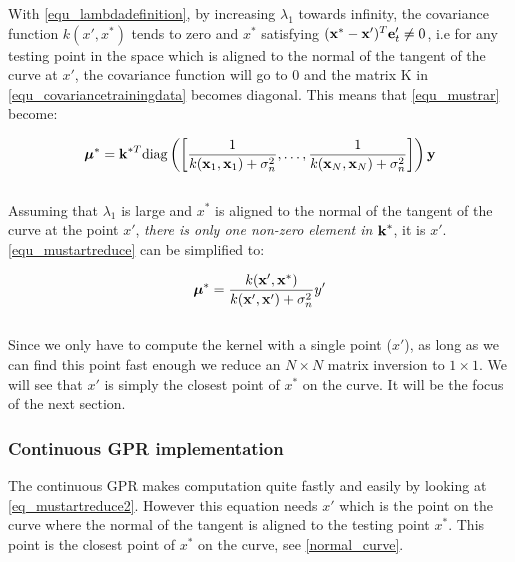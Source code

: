 With \autoref{equ_lambdadefinition}, by increasing $\lambda_1$ towards infinity, the covariance function $k(x', x^*)$ tends to zero and $x^*$ satisfying $(\boldsymbol{\mathbf{x}}^* - \boldsymbol{\mathbf{x}}')^T\boldsymbol{\mathbf{e}}'_t \neq 0$, i.e for any testing point in the space which is aligned to the normal of the tangent of the curve at $x'$, the covariance function will go to 0 and the matrix \mat K in \autoref{equ_covariancetrainingdata} becomes diagonal. This means that \autoref{equ_mustrar} become:

\begin{equation}
  \label{equ_mustartreduce}
    \boldsymbol{\mathbf{\mu}}^* = \boldsymbol{\mathbf{k}}^{*T} \text{diag}\left(\left[\frac{1}{k(\boldsymbol{\mathbf{x}}_1,\boldsymbol{\mathbf{x}}_1)+\sigma_n^2},\hdots,\frac{1}{k(\boldsymbol{\mathbf{x}}_N,\boldsymbol{\mathbf{x}}_N)+\sigma_n^2}\right]\right)\boldsymbol{\mathbf{y}}
\end{equation}
\\

Assuming that $\lambda_1$ is large and $x^*$ is aligned to the normal of the tangent of the curve at the point $x'$, \emph{there is only one non-zero element in } $\boldsymbol{\mathbf{k}}^*$, it is $x'$. \autoref{equ_mustartreduce} can be simplified to:

\begin{equation}
  \label{eq_mustartreduce2}
    \boldsymbol{\mathbf{\mu}}^* = \frac{k(\boldsymbol{\mathbf{x}}',\boldsymbol{\mathbf{x}}^*)}{k(\boldsymbol{\mathbf{x}}',\boldsymbol{\mathbf{x}}') + \sigma_n^2} y'
\end{equation}
\\

Since we only have to compute the kernel with a single point ($x'$), as long as we can find this point fast enough we reduce an $N \times N$ matrix inversion to $1 \times 1$. We will see that $x'$ is simply the closest point of $x^*$ on the curve. It will be the focus of the next section.

\subsubsection{Continuous GPR implementation}

The continuous GPR makes computation quite fastly and easily by looking at \autoref{eq_mustartreduce2}. However this equation needs $x'$ which is the point on the curve where the normal of the tangent is aligned to the testing point $x^*$. This point is the closest point of $x^*$ on the curve, see \autoref{normal_curve}.\\

